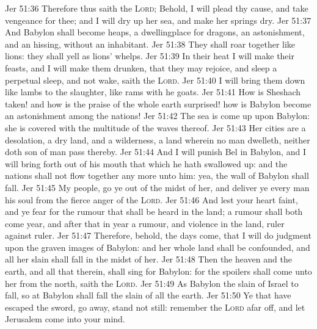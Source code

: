 \vs Jer 51:36 Therefore thus saith the \textsc{Lord}; Behold, I will plead thy cause, and take vengeance for thee; and I will dry up her sea, and make her springs dry.
\vs Jer 51:37 And Babylon shall become heaps, a dwellingplace for dragons, an astonishment, and an hissing, without an inhabitant.
\vs Jer 51:38 They shall roar together like lions: they shall yell as lions' whelps.
\vs Jer 51:39 In their heat I will make their feasts, and I will make them drunken, that they may rejoice, and sleep a perpetual sleep, and not wake, saith the \textsc{Lord}.
\vs Jer 51:40 I will bring them down like lambs to the slaughter, like rams with he goats.
\vs Jer 51:41 How is Sheshach taken! and how is the praise of the whole earth surprised! how is Babylon become an astonishment among the nations!
\vs Jer 51:42 The sea is come up upon Babylon: she is covered with the multitude of the waves thereof.
\vs Jer 51:43 Her cities are a desolation, a dry land, and a wilderness, a land wherein no man dwelleth, neither doth  son of man pass thereby.
\vs Jer 51:44 And I will punish Bel in Babylon, and I will bring forth out of his mouth that which he hath swallowed up: and the nations shall not flow together any more unto him: yea, the wall of Babylon shall fall.
\vs Jer 51:45 My people, go ye out of the midst of her, and deliver ye every man his soul from the fierce anger of the \textsc{Lord}.
\vs Jer 51:46 And lest your heart faint, and ye fear for the rumour that shall be heard in the land; a rumour shall both come  year, and after that in  year  a rumour, and violence in the land, ruler against ruler.
\vs Jer 51:47 Therefore, behold, the days come, that I will do judgment upon the graven images of Babylon: and her whole land shall be confounded, and all her slain shall fall in the midst of her.
\vs Jer 51:48 Then the heaven and the earth, and all that  therein, shall sing for Babylon: for the spoilers shall come unto her from the north, saith the \textsc{Lord}.
\vs Jer 51:49 As Babylon  the slain of Israel to fall, so at Babylon shall fall the slain of all the earth.
\vs Jer 51:50 Ye that have escaped the sword, go away, stand not still: remember the \textsc{Lord} afar off, and let Jerusalem come into your mind.
